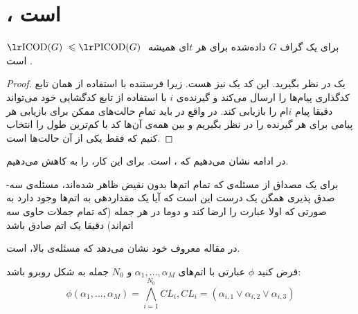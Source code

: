 \section{\lpicod،
\nphard
 است}

\begin{lemma}
برای یک گراف
$G$
داده‌شده برای هر
$t$ای همیشه
 $\icodg \leq \picodg$
 است \cite{pliablefirstpaper}.
\end{lemma}
\begin{proof}
	یک 
	\icod
	در نظر بگیرید. این کد یک
	\picod
	نیز هست. زیرا فرستنده با استفاده از همان تابع کدگذاری پیام‌ها را ارسال می‌کند و گیرنده‌ی
	$i$
	با استفاده از تابع کدگشایی خود می‌تواند دقیقا	 پیام
	$i$ام را بازیابی کند. در واقع در
	\picod
	باید تمام حالت‌های ممکن برای بازیابی هر پیامی برای هر گیرنده را در نظر بگیریم و بین همه‌ی آن‌ها کد با کم‌ترین طول را انتخاب کنیم که 
	\icod
	فقط یکی از آن حالت‌ها است.
\end{proof}

در ادامه نشان می‌دهیم که
،
\nphard
است. برای این کار، 
\lpicod
 را به
کاهش می‌دهیم.

\begin{definition}
	برای یک مصداق از مسئله‌ی 
که تمام اتم‌ها بدون نقیض ظاهر شده‌اند، مسئله‌ی سه-صدق پذیری همگن یک درست این است که آیا یک مقداردهی به اتم‌ها وجود دارد به صورتی که اولا عبارت را ارضا کند و دوما در هر جمله (که تمام جملات حاوی سه اتم‌اند) دقیقا یک اتم صادق باشد
\end{definition}

در مقاله معروف خود
\cite{10.1145/800133.804350}
نشان می‌دهد که مسئله‌ی بالا، 
\nphard
است.

فرض کنید
$\phi$
عبارتی با اتم‌های
$\alpha_1, \ldots, \alpha_M$
و
$N_0$
جمله به شکل روبرو باشد:
$$\phi(\alpha_1, \ldots, \alpha_M) = \bigwedge\limits_{i = 1}^{N_0} CL_i, CL_i = (\alpha_{i, 1} \vee \alpha_{i, 2} \vee \alpha_{i, 3})$$

